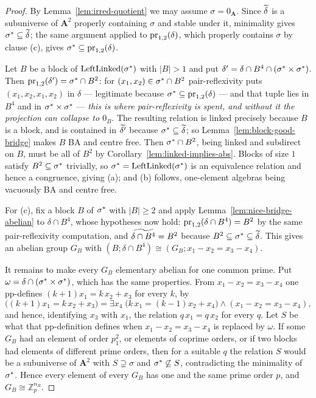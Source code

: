\begin{proof}
By Lemma~\ref{lem:irred-quotient} we may assume $\sigma=0_{\mathbf A}$. Since
$\widetilde{\delta}$ is a subuniverse of $\mathbf A^{2}$ properly containing $\sigma$
and stable under it, minimality gives $\sigma^{*}\subseteq\widetilde{\delta}$; the
same argument applied to $\operatorname*{pr}_{1,2}(\delta)$, which properly contains $\sigma$
by clause (c), gives $\sigma^{*}\subseteq\operatorname*{pr}_{1,2}(\delta)$.

Let $B$ be a block of $\operatorname{LeftLinked}(\sigma^{*})$ with $|B|>1$ and
put $\delta'=\delta\cap B^{4}\cap(\sigma^{*}\times\sigma^{*})$. Then
$\operatorname*{pr}_{1,2}(\delta')=\sigma^{*}\cap B^{2}$: for
$(x_{1},x_{2})\in\sigma^{*}\cap B^{2}$ pair-reflexivity puts
$(x_{1},x_{2},x_{1},x_{2})$ in $\delta$ --- legitimate because
$\sigma^{*}\subseteq\operatorname*{pr}_{1,2}(\delta)$ --- and that tuple lies in $B^{4}$
and in $\sigma^{*}\times\sigma^{*}$ --- \emph{this is where
pair-reflexivity is spent, and without it the projection can collapse to
$0_{B}$}. The resulting relation is linked precisely because $B$ is a block,
and is contained in $\widetilde{\delta'}$ because $\sigma^{*}\subseteq\widetilde{\delta}$;
so Lemma~\ref{lem:block-good-bridge} makes $B$ BA and centre free. Then
$\sigma^{*}\cap B^{2}$, being linked and subdirect on $B$, must be all of
$B^{2}$ by Corollary~\ref{lem:linked-implies-abs}. Blocks of size $1$ satisfy
$B^{2}\subseteq\sigma^{*}$ trivially, so
$\sigma^{*}=\operatorname{LeftLinked}(\sigma^{*})$ is an equivalence
relation and hence a congruence, giving (a); and (b) follows, one-element
algebras being vacuously BA and centre free.

For (c), fix a block $B$ of $\sigma^{*}$ with $|B|\ge2$ and apply
Lemma~\ref{lem:nice-bridge-abelian} to $\delta\cap B^{4}$, whose hypotheses now
hold: $\operatorname*{pr}_{1,2}(\delta\cap B^{4})=B^{2}$ by the same pair-reflexivity
computation, and $\widetilde{\delta\cap B^{4}}=B^{2}$ because
$B^{2}\subseteq\sigma^{*}\subseteq\widetilde{\delta}$. This gives an abelian group
$G_{B}$ with $(B;\delta\cap B^{4})\cong(G_{B};x_{1}-x_{2}=x_{3}-x_{4})$.

It remains to make every $G_{B}$ elementary abelian for one common prime. Put
$\omega=\delta\cap(\sigma^{*}\times\sigma^{*})$, which has the same
properties. From $x_{1}-x_{2}=x_{3}-x_{4}$ one pp-defines
$(k+1)x_{1}=k\,x_{2}+x_{3}$ for every $k$, by
\[
  \bigl((k+1)x_{1}=k\,x_{2}+x_{3}\bigr)=\exists x_{4}\;
  \bigl(k\,x_{1}=(k-1)x_{2}+x_{4}\bigr)\wedge(x_{1}-x_{2}=x_{3}-x_{4}),
\]
and hence, identifying $x_{3}$ with $x_{1}$, the relation
$q\,x_{1}=q\,x_{2}$ for every $q$. Let $S$ be what that pp-definition defines
when $x_{1}-x_{2}=x_{3}-x_{4}$ is replaced by $\omega$. If some $G_{B}$ had an
element of order $p_{1}^{2}$, or elements of coprime orders, or if two blocks
had elements of different prime orders, then for a suitable $q$ the relation $S$
would be a subuniverse of $\mathbf A^{2}$ with $S\supsetneq\sigma$ and
$\sigma^{*}\not\subseteq S$, contradicting the minimality of $\sigma^{*}$.
Hence every element of every $G_{B}$ has one and the same prime order $p$, and
$G_{B}\cong\mathbb Z_{p}^{n_{B}}$.
\end{proof}

